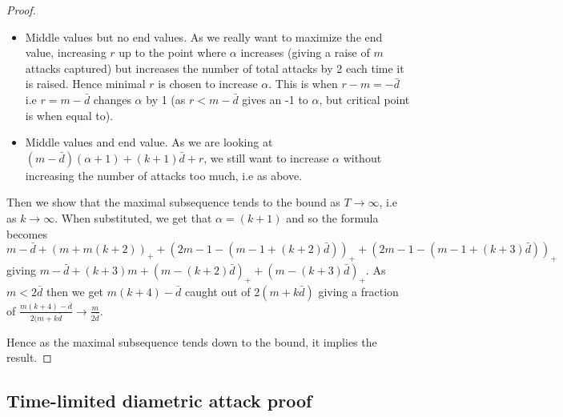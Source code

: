 \documentclass[a4paper,10pt]{article}
\newcommand{\pospart}[1]{\left( #1 \right)_{+}}
\theoremstyle{definition}
\theoremstyle{definition}
\theoremstyle{remark}
\theoremstyle{definition}
\begin{document}
\begin{proof}
\begin{itemize}
\item Middle values but no end values. As we really want to maximize the end value, increasing $r$ up to the point where $\alpha$ increases (giving a raise of $m$ attacks captured) but increases the number of total attacks by 2 each time it is raised. Hence minimal $r$ is chosen to increase $\alpha$. This is when $r-m=-\bar{d}$ i.e $r=m-\bar{d}$ changes $\alpha$ by 1 (as $r<m-\bar{d}$ gives an -1 to $\alpha$, but critical point is when equal to).

\item Middle values and end value. As we are looking at $(m-\bar{d})(\alpha+1)+(k+1)\bar{d}+r$, we still want to increase $\alpha$ without increasing the number of attacks too much, i.e as above.
\end{itemize}

Then we show that the maximal subsequence tends to the bound as $T \rightarrow \infty$, i.e as $k \rightarrow \infty$.
When substituted, we get that
$\alpha=(k+1)$ and so the formula becomes
$m-\bar{d}+\pospart{m + m(k+2)} + \pospart{2m-1-(m-1+(k+2)\bar{d})}+\pospart{2m-1-(m-1+(k+3)\bar{d})}$
giving $m-\bar{d}+(k+3)m + \pospart{m-(k+2)\bar{d}}+\pospart{m-(k+3)\bar{d}}$.
As $m < 2\bar{d}$ then we get $m(k+4) -\bar{d}$ caught out of $2(m+k\bar{d})$
giving a fraction of $\frac{m(k+4)-\bar{d}}{2(m+k\bar{d}} \rightarrow \frac{m}{2\bar{d}}$.

Hence as the maximal subsequence tends down to the bound, it implies the result.
\end{proof}

\subsection{Time-limited diametric attack proof}
\label{Time-limited diametric attack proof}
\end{document}
